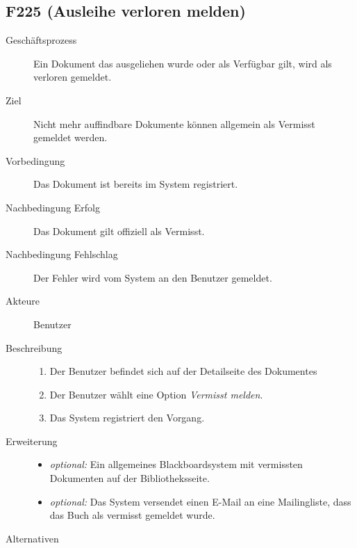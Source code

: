 \subsection{F225 (Ausleihe verloren melden)}
\begin{description}
  \item[Geschäftsprozess]Ein Dokument das ausgeliehen wurde oder als Verfügbar gilt, wird als verloren gemeldet.
  \item[Ziel]Nicht mehr auffindbare Dokumente können allgemein als Vermisst gemeldet werden.
  \item[Vorbedingung]Das Dokument ist bereits im System registriert.
  \item[Nachbedingung Erfolg]Das Dokument gilt offiziell als Vermisst.
  \item[Nachbedingung Fehlschlag]Der Fehler wird vom System an den Benutzer gemeldet.
  \item[Akteure]Benutzer
  \item[Beschreibung]\hfill
    \begin{enumerate}
      \item Der Benutzer befindet sich auf der Detailseite des Dokumentes
      \item Der Benutzer wählt eine Option \emph{Vermisst melden}.
      \item Das System registriert den Vorgang.
    \end{enumerate}
  \item[Erweiterung]\hfill
    \begin{itemize}
      \item \emph{optional:} Ein allgemeines Blackboardsystem mit vermissten Dokumenten auf der Bibliotheksseite.
      \item \emph{optional:} Das System versendet einen E-Mail an eine Mailingliste, dass das Buch als vermisst gemeldet wurde.
    \end{itemize}
  \item[Alternativen]
\end{description}


